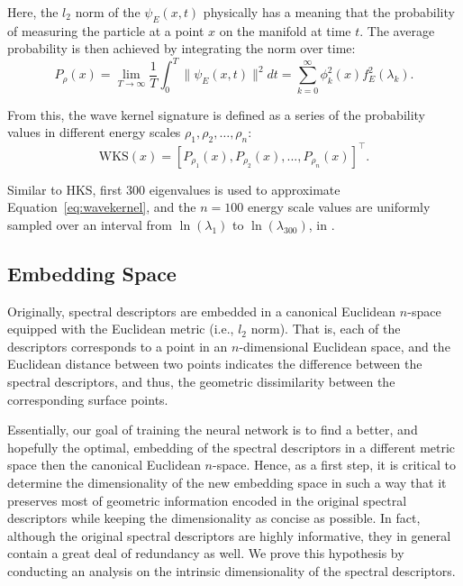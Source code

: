 \documentclass[5p,twocolumn,10pt,times]{elsarticle}
\begin{document}
Here, the $l_2$ norm of the $\psi_E(x,t)$ physically has a meaning that the probability of measuring the particle at a point $x$ on the manifold at time $t$. The average probability is then achieved by integrating the norm over time:
\begin{equation}
    P_\rho(x) =\lim_{T\to\infty}\frac{1}{T}\int_{0}^{T}\|\psi_E(x,t)\|^2 dt =\sum_{k=0}^{\infty}\phi_k^2(x)f_E^2(\lambda_k).
    \label{eq:wavekernel}
\end{equation}

From this, the wave kernel signature is defined as a series of the probability values in different energy scales $\rho_1, \rho_2, \hdots, \rho_n$:
\begin{equation}
    \text{WKS}(x) = \left[ P_{\rho_1}(x),P_{\rho_2}(x),...,P_{\rho_n}(x) \right]^\top.
\end{equation}

Similar to HKS, first 300 eigenvalues is used to approximate Equation~\ref{eq:wavekernel}, and the $n=100$ energy scale values are uniformly sampled over an interval from $\ln(\lambda_1)$ to $\ln(\lambda_{300})$, in \cite{aubry2011wave}.


\subsection{Embedding Space}
\label{sec:embedding}

Originally, spectral descriptors are embedded in a canonical Euclidean $n$-space equipped with the Euclidean metric (i.e., $l_2$ norm). That is, each of the descriptors corresponds to a point in an $n$-dimensional Euclidean space, and the Euclidean distance between two points indicates the difference between the spectral descriptors, and thus, the geometric dissimilarity between the corresponding surface points.

Essentially, our goal of training the neural network is to find a better, and hopefully the optimal, embedding of the spectral descriptors in a different metric space then the canonical Euclidean $n$-space. Hence, as a first step, it is critical to determine the dimensionality of the new embedding space in such a way that it preserves most of geometric information encoded in the original spectral descriptors while keeping the dimensionality as concise as possible. In fact, although the original spectral descriptors are highly informative, they in general contain a great deal of redundancy as well. We prove this hypothesis by conducting an analysis on the intrinsic dimensionality of the spectral descriptors.
\end{document}
